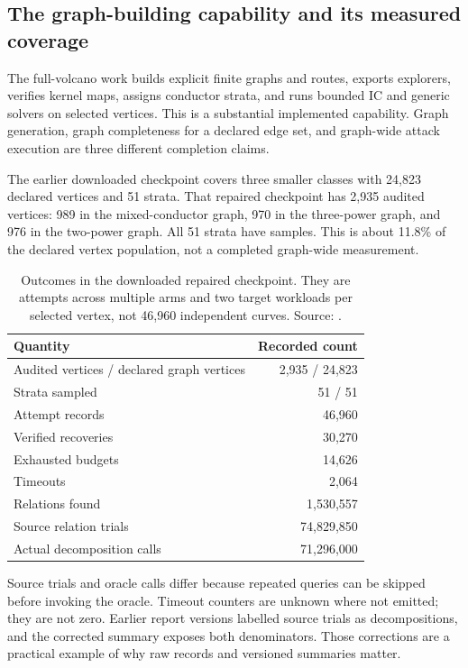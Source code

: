 \subsection{The graph-building capability and its measured coverage}

The full-volcano work builds explicit finite graphs and routes, exports
explorers, verifies kernel maps, assigns conductor strata, and runs
bounded IC and generic solvers on selected vertices. This is a
substantial implemented capability. Graph generation, graph completeness
for a declared edge set, and graph-wide attack execution are three
different completion claims.

The earlier downloaded checkpoint covers three smaller classes with 24,823
declared vertices and 51 strata. That repaired checkpoint has 2,935
audited vertices: 989 in the mixed-conductor graph, 970 in the
three-power graph, and 976 in the two-power graph. All 51 strata have
samples. This is about 11.8\% of the declared vertex population,
not a completed graph-wide measurement.

\begin{table}[htbp]\small
\caption{Outcomes in the downloaded repaired checkpoint. They are
attempts across multiple arms and two target workloads per selected
vertex, not 46,960 independent curves. Source: .}
\begin{tabular}{@{}lr@{}}\toprule
Quantity & Recorded count \\\midrule
Audited vertices / declared graph vertices & 2,935 / 24,823 \\
Strata sampled & 51 / 51 \\
Attempt records & 46,960 \\
Verified recoveries & 30,270 \\
Exhausted budgets & 14,626 \\
Timeouts & 2,064 \\
Relations found & 1,530,557 \\
Source relation trials & 74,829,850 \\
Actual decomposition calls & 71,296,000 \\
\bottomrule
\end{tabular}
\end{table}

Source trials and oracle calls differ because repeated queries can be
skipped before invoking the oracle. Timeout counters are unknown where
not emitted; they are not zero. Earlier report versions labelled source
trials as decompositions, and the corrected summary exposes both
denominators. Those corrections are a practical example of why raw
records and versioned summaries matter.

